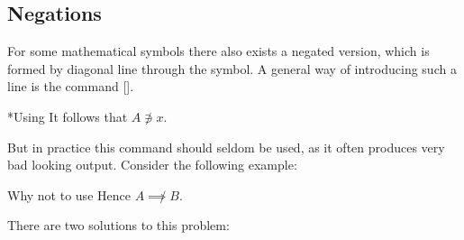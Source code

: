 \subsection{Negations}

For some mathematical symbols there also exists a negated version, which is formed by diagonal line through the symbol.
A general way of introducing such a line is the command [\comname].
\begin{showlatex}*{Using }
  It follows that $A \not\ni x$.
\end{showlatex}
But in practice this command should seldom be used, as it often produces very bad looking output.
Consider the following example:
\begin{showlatex}{Why not to use }
  Hence $A \not\implies B$.
\end{showlatex}
There are two solutions to this problem:

